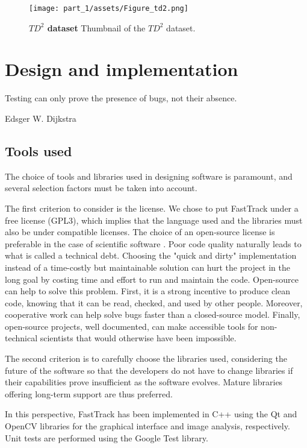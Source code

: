 	\begin{figure}[ht]
    \centering
    \texttt{[image: part\_1/assets/Figure\_td2.png]}
    \caption{{\bf $TD^2$ dataset} Thumbnail of the $TD^2$ dataset.}
    \label{part_1:dataset}
    \end{figure}

    

\chapter{Design and implementation}

    \epigraph{Testing can only prove the presence of bugs, not their absence.}{Edsger W. Dijkstra}

    \section{Tools used}
    The choice of tools and libraries used in designing software is paramount, and several selection factors must be taken into account.

    The first criterion to consider is the license. We chose to put FastTrack under a free license (GPL3), which implies that the language used and the libraries must also be under compatible licenses. The choice of an open-source license is preferable in the case of scientific software \cite{easterbrook2014open}. Poor code quality naturally leads to what is called a technical debt. Choosing the "quick and dirty" implementation instead of a time-costly but maintainable solution can hurt the project in the long goal by costing time and effort to run and maintain the code. Open-source can help to solve this problem. First, it is a strong incentive to produce clean code, knowing that it can be read, checked, and used by other people. Moreover, cooperative work can help solve bugs faster than a closed-source model. Finally, open-source projects, well documented, can make accessible tools for non-technical scientists that would otherwise have been impossible.

    The second criterion is to carefully choose the libraries used, considering the future of the software so that the developers do not have to change libraries if their capabilities prove insufficient as the software evolves. Mature libraries offering long-term support are thus preferred.

    In this perspective, FastTrack has been implemented in C++ using the Qt \cite{Qt} and OpenCV \cite{opencv_library} libraries for the graphical interface and image analysis, respectively. Unit tests are performed using the Google Test library.

